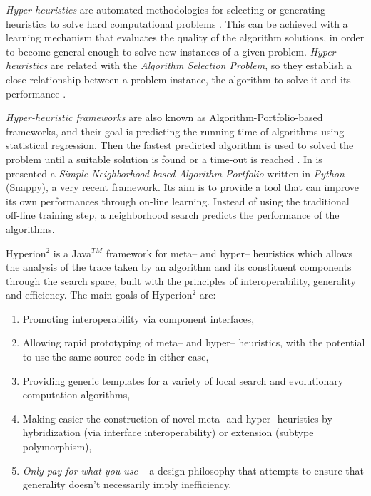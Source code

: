 \textit{Hyper-heuristics} are automated methodologies for selecting or generating heuristics to solve hard computational problems \cite{Chakhlevitch2008}. This can be achieved with a learning mechanism that evaluates the quality of the algorithm solutions, in order to become general enough to solve new instances of a given problem. \textit{Hyper-heuristics} are related with the \textit{Algorithm Selection Problem}, so they establish a close relationship between a problem instance, the algorithm to solve it and its performance \cite{Ryser-welch}.   

\textit{Hyper-heuristic frameworks} are also known as Algorithm-Portfolio-based frameworks, and their goal is predicting the running time of algorithms using statistical regression. Then the fastest predicted algorithm is used to solved the problem until a suitable solution is found or a time-out is reached \cite{Leyton-Brown2003}. In \cite{Samulowitz2013} is presented a \textit{Simple Neighborhood-based Algorithm Portfolio} written in \textit{Python} (Snappy), a very recent framework. Its aim is to provide a tool that can improve its own performances through on-line learning. Instead of using the traditional off-line training step, a neighborhood search predicts the performance of the algorithms.

{\sc Hyperion}$^2$ \cite{Brownlee2014} is a Java$^{TM}$ framework for meta-- and hyper-- heuristics which allows the analysis of the trace taken by an algorithm and its constituent components through the search space, built with the principles of interoperability, generality and efficiency. The main goals of {\sc Hyperion}$^2$ are:
\begin{enumerate} %
\item Promoting interoperability via component interfaces,
\item Allowing rapid prototyping of meta-- and hyper-- heuristics, with the potential to use the same source code in either case,
\item Providing generic templates for a variety of local search and evolutionary computation algorithms,
\item Making easier the construction of novel meta- and hyper- heuristics by hybridization (via interface interoperability) or extension (subtype polymorphism),
\item {\it Only pay for what you use} -- a design philosophy that attempts to ensure that generality doesn't necessarily imply inefficiency.
\end{enumerate}%

